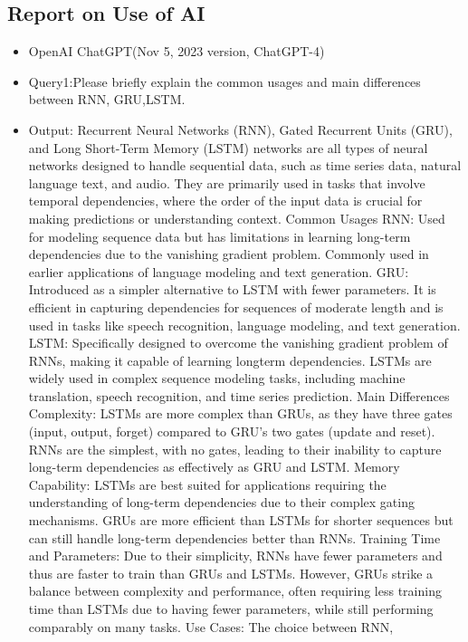 \documentclass{mcmthesis}
\begin{document}
\begin{appendices}
\section{Report on Use of AI}
\begin{itemize}
\item OpenAI ChatGPT(Nov 5, 2023 version, ChatGPT-4)
\item Query1:Please briefly explain the common usages and main differences between RNN, GRU,LSTM.
\item Output: Recurrent Neural Networks (RNN), Gated Recurrent Units (GRU), and Long Short-Term  Memory (LSTM) networks are all types of neural networks designed to handle sequential data, such as
time series data, natural language text, and audio. They are primarily used in tasks that involve temporal
dependencies, where the order of the input data is crucial for making predictions or understanding
context. Common Usages RNN: Used for modeling sequence data but has limitations in learning
long-term dependencies due to the vanishing gradient problem. Commonly used in earlier applications
of language modeling and text generation. GRU: Introduced as a simpler alternative to LSTM with
fewer parameters. It is efficient in capturing dependencies for sequences of moderate length and is
used in tasks like speech recognition, language modeling, and text generation. LSTM: Specifically
designed to overcome the vanishing gradient problem of RNNs, making it capable of learning longterm dependencies. LSTMs are widely used in complex sequence modeling tasks, including machine
translation, speech recognition, and time series prediction. Main Differences Complexity: LSTMs are
more complex than GRUs, as they have three gates (input, output, forget) compared to GRU’s two
gates (update and reset). RNNs are the simplest, with no gates, leading to their inability to capture
long-term dependencies as effectively as GRU and LSTM. Memory Capability: LSTMs are best suited
for applications requiring the understanding of long-term dependencies due to their complex gating
mechanisms. GRUs are more efficient than LSTMs for shorter sequences but can still handle long-term
dependencies better than RNNs. Training Time and Parameters: Due to their simplicity, RNNs have
fewer parameters and thus are faster to train than GRUs and LSTMs. However, GRUs strike a balance
between complexity and performance, often requiring less training time than LSTMs due to having
fewer parameters, while still performing comparably on many tasks. Use Cases: The choice between
RNN,
  \end{itemize}
\end{appendices}
\end{document}
